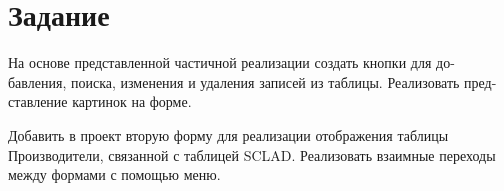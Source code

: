 \section{Задание}

На основе представленной частичной реализации создать кнопки для до-
бавления, поиска, изменения и удаления записей из таблицы. Реализовать пред-
ставление картинок на форме.

Добавить в проект вторую форму для реализации отображения таблицы
Производители, связанной с таблицей SCLAD. Реализовать взаимные переходы
между формами с помощью меню.
